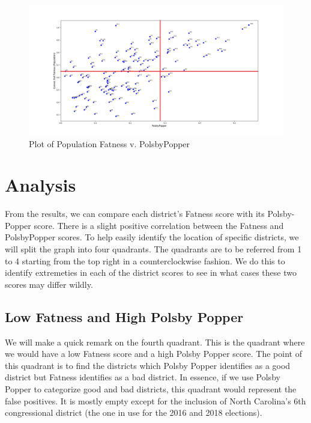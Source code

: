 \documentclass[letterpaper]{article}
\begin{document}
\begin{figure}[H]
	\includegraphics[width=\linewidth]{./figures/convexHullPopulationFatnessVPP2Edited.png}
	\caption{Plot of Population Fatness v. PolsbyPopper}
	\label{fig:datapoints}
\end{figure}

\section{Analysis}
From the results, we can compare each district's Fatness score with its Polsby-Popper score. There is a slight positive correlation between the Fatness and PolsbyPopper scores.
To help easily identify the location of specific districts, we will split the graph into four quadrants. The quadrants are to be referred from 1 to 4 starting from the top right in a counterclockwise fashion. We do this to identify extremeties in each of the district scores to see in what cases these two scores may differ wildly.

\subsection{Low Fatness and High Polsby Popper}
We will make a quick remark on the fourth quadrant. This is the quadrant where we would have a low Fatness score and a high Polsby Popper score. The point of this quadrant is to find the districts which Polsby Popper identifies as a good district but Fatness identifies as a bad district. In essence, if we use Polsby Popper to categorize good and bad districts, this quadrant would represent the false positives. It is mostly empty except for the inclusion of North Carolina's 6th congressional district (the one in use for the 2016 and 2018 elections).
\end{document}

